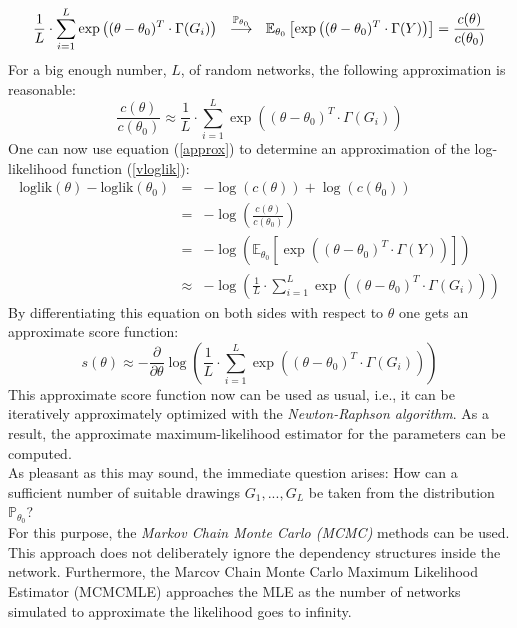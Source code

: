 \documentclass[headsepline=true, abstracton]{scrartcl}
\begin{document}
%
\begin{equation}
\frac{1}{L}\cdot \sum_{i=1}^{L}  \exp\left((\theta - \theta_0)^T \cdot \Gamma(G_i)\right)
~~\stackrel {{\tiny\mathbb{P}_{\theta_0}}}{\longrightarrow}~~ \mathbb{E}_{\theta_0}\left[ \exp\left((\theta - \theta_0)^T \cdot \Gamma(Y)\right) \right] = \frac{c(\theta)}{c(\theta_0)}
\label{konver}
\end{equation}
%
For a big enough number, $L$, of random networks, the following approximation is reasonable:
%
\begin{equation}
\frac{c(\theta)}{c(\theta_0)} \approx \frac{1}{L}\cdot \sum_{i=1}^{L}  \exp\left((\theta - \theta_0)^T \cdot \Gamma(G_i)\right)
\label{approx}
\end{equation}
%
One can now use equation (\ref{approx}) to determine an approximation of the log-likelihood function (\ref{vloglik}):
%
\begin{eqnarray*}
\text{loglik}(\theta)-\text{loglik}(\theta_0)&=&- \log(c(\theta))+\log(c(\theta_0))\\
                                             &=&- \log \left( \frac{c(\theta)}{c(\theta_0)} \right)\\
                                             &=&- \log \left( \mathbb{E}_{\theta_0}\left[ \exp\left((\theta - \theta_0)^T \cdot \Gamma(Y)\right) \right] \right)\\
                                             &\approx &- \log \left( \frac{1}{L} \cdot \sum_{i=1}^{L}  \exp \left((\theta - \theta_0)^T \cdot \Gamma(G_i) \right) \right)
\end{eqnarray*}
%
By differentiating this equation on both sides with respect to $\theta$ one gets an approximate score function:
%
\begin{equation}
s(\theta) \approx -\frac{\partial}{\partial \theta} \log \left( \frac{1}{L} \cdot \sum_{i=1}^{L}  \exp \left((\theta - \theta_0)^T \cdot \Gamma(G_i) \right) \right)
\label{score}
\end{equation}
%
This approximate score function now can be used as usual, i.e., it can be iteratively approximately optimized with the \textit{Newton-Raphson algorithm}. As a result, the approximate maximum-likelihood estimator for the parameters can be computed.\\[0.4cm]
As pleasant as this may sound, the immediate question arises: How can a sufficient number of suitable drawings $G_1,...,G_L$ be taken from the distribution $\mathbb{P}_{\theta_0}$? \\
For this purpose, the \textit{Markov Chain Monte Carlo (MCMC)} methods can be used. This approach does not deliberately ignore the dependency structures inside the network. Furthermore, the Marcov Chain Monte Carlo Maximum Likelihood Estimator (MCMCMLE) approaches the MLE as the number of networks simulated to approximate the likelihood goes to infinity.
\end{document}
